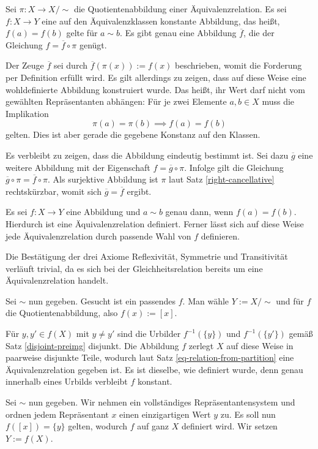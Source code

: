 \newpage
\begin{Satz}%
\label{quotient-universal-property}\newlinefirst
Sei $\pi\colon X\to X/{\sim}$ die Quotientenabbildung einer
Äquivalenzrelation. Es sei $f\colon X\to Y$ eine auf den
Äquivalenzklassen konstante Abbildung, das heißt, $f(a)=f(b)$ gelte
für $a\sim b$. Es gibt genau eine Abbildung $\overline f$, die der
Gleichung $f=\overline f\circ\pi$ genügt.
\end{Satz}
\begin{Beweis}
Der Zeuge $\overline f$ sei durch $\overline f(\pi(x)):=f(x)$
beschrieben, womit die Forderung
per Definition erfüllt wird. Es gilt allerdings zu zeigen, dass auf
diese Weise eine wohldefinierte Abbildung konstruiert wurde.
Das heißt, ihr Wert darf nicht vom gewählten Repräsentanten abhängen:
Für je zwei Elemente $a,b\in X$ muss die Implikation
\[\pi(a)=\pi(b) \implies f(a) = f(b)\]
gelten. Dies ist aber gerade die gegebene Konstanz auf den Klassen.

Es verbleibt zu zeigen, dass die Abbildung eindeutig bestimmt
ist. Sei dazu $\overline g$ eine weitere Abbildung mit der Eigenschaft
$f=\overline g\circ\pi$. Infolge gilt die Gleichung
$\overline g\circ\pi = \overline f\circ\pi$. Als surjektive Abbildung
ist $\pi$ laut Satz \ref{right-cancellative} rechtskürzbar, womit sich
$\overline g = \overline f$ ergibt.\,\qedsymbol
\end{Beweis}

\begin{Satz}
Es sei $f\colon X\to Y$ eine Abbildung und $a\sim b$ genau dann,
wenn $f(a)=f(b)$. Hierdurch ist eine Äquivalenzrelation definiert.
Ferner lässt sich auf diese Weise jede Äquivalenzrelation durch
passende Wahl von $f$ definieren.
\end{Satz}
\begin{Beweis}[Beweis 1]
Die Bestätigung der drei Axiome Reflexivität, Symmetrie und
Transitivität verläuft trivial, da es sich bei der Gleichheitsrelation
bereits um eine Äquivalenzrelation handelt.

Sei ${\sim}$ nun gegeben. Gesucht ist ein passendes $f$. Man wähle
$Y:=X/{\sim}$ und für $f$ die Quotientenabbildung, also $f(x):=[x]$.\,\qedsymbol
\end{Beweis}
\begin{Beweis}[Beweis 2]
Für $y,y'\in f(X)$ mit $y\ne y'$ sind die Urbilder $f^{-1}(\{y\})$ und
$f^{-1}(\{y'\})$ gemäß Satz \ref{disjoint-preimg} disjunkt. Die
Abbildung $f$ zerlegt $X$ auf diese Weise in paarweise disjunkte
Teile, wodurch laut Satz \ref{eq-relation-from-partition} eine
Äquivalenzrelation gegeben ist. Es ist dieselbe, wie definiert
wurde, denn genau innerhalb eines Urbilds verbleibt $f$ konstant.

Sei ${\sim}$ nun gegeben. Wir nehmen ein vollständiges
Repräsentantensystem und ordnen jedem Repräsentant $x$ einen
einzigartigen Wert $y$ zu. Es soll nun $f([x])=\{y\}$ gelten,
wodurch $f$ auf ganz $X$ definiert wird. Wir setzen
$Y:=f(X)$.\,\qedsymbol
\end{Beweis}

